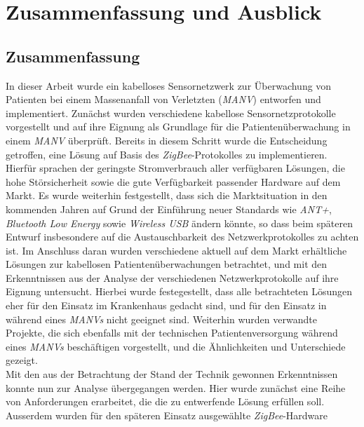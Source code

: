 
\chapter{Zusammenfassung und Ausblick}

\section{Zusammenfassung}
In dieser Arbeit wurde ein kabelloses Sensornetzwerk zur Überwachung von Patienten bei einem 
Massenanfall von Verletzten (\emph{MANV}) entworfen und implementiert. Zunächst wurden 
verschiedene kabellose Sensornetzprotokolle vorgestellt und auf ihre Eignung als Grundlage für
die Patientenüberwachung in einem \emph{MANV} überprüft. Bereits in diesem Schritt wurde die Entscheidung
getroffen, eine Lösung auf Basis des \emph{ZigBee}-Protokolles zu implementieren. Hierfür sprachen
der geringste Stromverbrauch aller verfügbaren Lösungen, die hohe Störsicherheit sowie die
gute Verfügbarkeit passender Hardware auf dem Markt. Es wurde weiterhin festgestellt, dass sich die
Marktsituation in den kommenden Jahren auf Grund der Einführung neuer Standards wie \emph{ANT+},
\emph{Bluetooth Low Energy} sowie \emph{Wireless USB} ändern könnte, so dass beim späteren Entwurf
insbesondere auf die Austauschbarkeit des Netzwerkprotokolles zu achten ist. Im Anschluss daran wurden
verschiedene aktuell auf dem Markt erhältliche Lösungen zur kabellosen Patientenüberwachungen betrachtet, 
und mit den Erkenntnissen aus der Analyse der verschiedenen Netzwerkprotokolle auf ihre Eignung untersucht.
Hierbei wurde festegestellt, dass alle betrachteten Lösungen eher für den Einsatz im Krankenhaus
gedacht sind, und für den Einsatz in während eines \emph{MANVs} nicht geeignet sind. Weiterhin wurden verwandte
Projekte, die sich ebenfalls mit der technischen Patientenversorgung während eines \emph{MANVs} beschäftigen
vorgestellt, und die Ähnlichkeiten und Unterschiede gezeigt.\\
Mit den aus der Betrachtung der Stand der Technik gewonnen Erkenntnissen konnte nun zur Analyse 
übergegangen werden. Hier wurde zunächst eine Reihe von Anforderungen erarbeitet, die die zu entwerfende 
Lösung erfüllen soll. Ausserdem wurden für den späteren Einsatz ausgewählte \emph{ZigBee}-Hardware 
